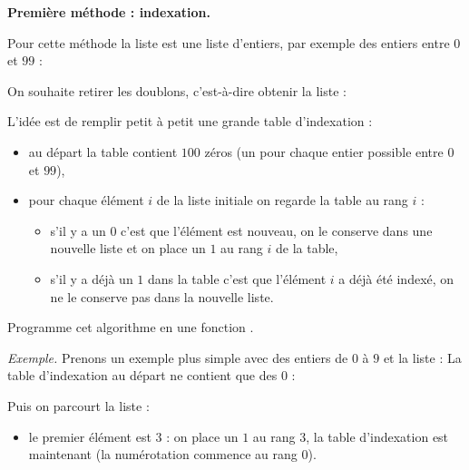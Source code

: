 \documentclass[11pt,class=report,crop=false]{standalone}
\begin{document}
\begin{activite}[Doublons]


\textbf{Première méthode : indexation.}
    
Pour cette méthode la liste est une liste d'entiers, par exemple des entiers entre $0$ et $99$ :

On souhaite retirer les doublons, c'est-à-dire obtenir la liste :
\mycenterline{\ci{[59, 72, 8, 37, 21, 22]}}

L'idée est de remplir petit à petit une grande table d'indexation :
\begin{itemize}
  \item au départ la table contient $100$ zéros (un pour chaque entier possible entre $0$ et $99$),
  
  \item pour chaque élément $i$ de la liste initiale on regarde la table au rang $i$ :
  \begin{itemize}
    \item s'il y a un $0$ c'est que l'élément est nouveau, on le conserve dans une nouvelle liste et on place un $1$ au rang $i$ de la table,
    
    \item s'il y a déjà un $1$ dans la table c'est que l'élément $i$ a déjà été indexé, on ne le conserve pas dans la nouvelle liste.
  \end{itemize}  
\end{itemize}

\bigskip

Programme cet algorithme en une fonction
.

\bigskip

\emph{Exemple.} 
Prenons un exemple plus simple avec des entiers de $0$ à $9$ et la liste :
La table d'indexation au départ ne contient que des $0$ :

Puis on parcourt la liste :
\begin{itemize}
  \item le premier élément est $3$ : on place un $1$ au rang $3$, la table d'indexation est maintenant \ci{[0, 0, 0, 1, 0, 0, 0, 0, 0, 0]} (la numérotation commence au rang $0$).
  

\end{itemize}
\end{activite}
\end{document}
